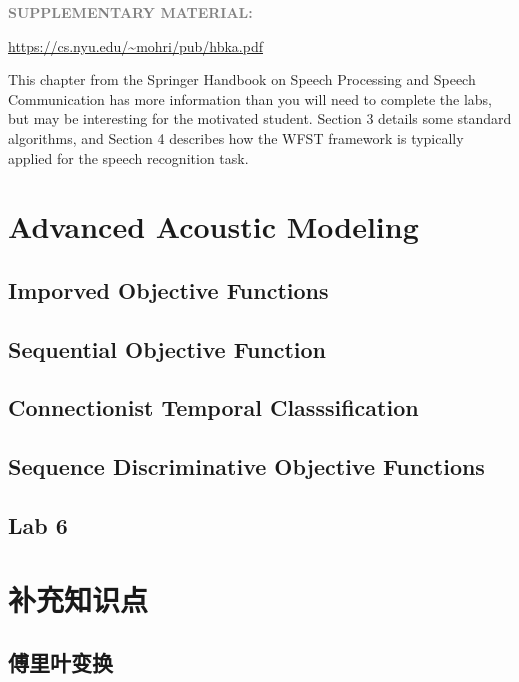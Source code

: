 {{\bf \textcolor{gray}{SUPPLEMENTARY MATERIAL:}}

\url{https://cs.nyu.edu/~mohri/pub/hbka.pdf}

This chapter from the Springer Handbook on Speech Processing and Speech Communication has more information than you will need to complete the labs, but may be interesting for the motivated student. Section 3 details some standard algorithms, and Section 4 describes how the WFST framework is typically applied for the speech recognition task.

\section{Advanced Acoustic Modeling}
\subsection{Imporved Objective Functions}

\subsection{Sequential Objective Function}

\subsection{Connectionist Temporal Classsification}

\subsection{Sequence Discriminative Objective Functions}

\subsection{Lab 6}


\section{补充知识点}

\subsection{傅里叶变换}

}
